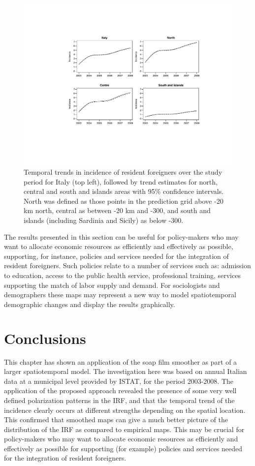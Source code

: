 \begin{figure}[t]
	\centering
		\includegraphics[width=\textwidth]{it/trends.pdf}
	\caption{Temporal trends in incidence of resident foreigners over the study period for Italy (top left), followed by trend estimates for north, central and south and islands areas with 95\% confidence intervals. North was defined as those points in the prediction grid above -20 km north, central as between -20 km and -300, and south and islands (including Sardinia and Sicily) as below -300.}
	\label{trends}
\end{figure}

The results presented in this section can be useful for policy-makers who may want to allocate economic resources as efficiently and effectively as possible, supporting, for instance, policies and services needed for the integration of resident foreigners. Such policies relate to a number of services such as: admission to education, access to the public health service, professional training, services supporting the match of labor supply and demand. For sociologists and demographers these maps may represent a new way to model spatiotemporal demographic changes and display the results graphically. 

\section{Conclusions}
\label{it-conc}

This chapter has shown an application of the soap film smoother as part of a larger spatiotemporal model. The investigation here was based on annual Italian data at a municipal level provided by ISTAT, for the period 2003-2008. The application of the proposed approach revealed the presence of some very well defined polarization patterns in the IRF, and that the temporal trend of the incidence clearly occurs at different strengths depending on the spatial location. This confirmed that smoothed maps can give a much better picture of the distribution of the IRF as compared to empirical maps. This may be crucial for policy-makers who may want to allocate economic resources as efficiently and effectively as possible for supporting (for example) policies and services needed for the integration of resident foreigners.

